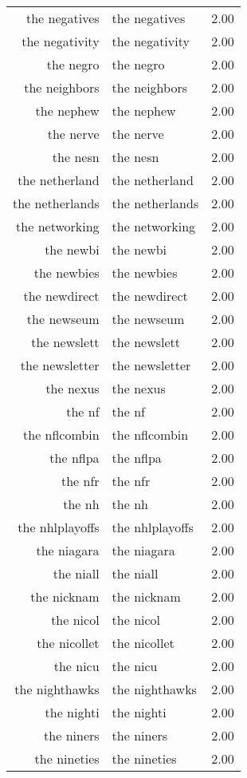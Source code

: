 \begin{table}[ht]
\begin{tabular}{rlr}
  the negatives & the negatives & 2.00 \\ 
  the negativity & the negativity & 2.00 \\ 
  the negro & the negro & 2.00 \\ 
  the neighbors & the neighbors & 2.00 \\ 
  the nephew & the nephew & 2.00 \\ 
  the nerve & the nerve & 2.00 \\ 
  the nesn & the nesn & 2.00 \\ 
  the netherland & the netherland & 2.00 \\ 
  the netherlands & the netherlands & 2.00 \\ 
  the networking & the networking & 2.00 \\ 
  the newbi & the newbi & 2.00 \\ 
  the newbies & the newbies & 2.00 \\ 
  the newdirect & the newdirect & 2.00 \\ 
  the newseum & the newseum & 2.00 \\ 
  the newslett & the newslett & 2.00 \\ 
  the newsletter & the newsletter & 2.00 \\ 
  the nexus & the nexus & 2.00 \\ 
  the nf & the nf & 2.00 \\ 
  the nflcombin & the nflcombin & 2.00 \\ 
  the nflpa & the nflpa & 2.00 \\ 
  the nfr & the nfr & 2.00 \\ 
  the nh & the nh & 2.00 \\ 
  the nhlplayoffs & the nhlplayoffs & 2.00 \\ 
  the niagara & the niagara & 2.00 \\ 
  the niall & the niall & 2.00 \\ 
  the nicknam & the nicknam & 2.00 \\ 
  the nicol & the nicol & 2.00 \\ 
  the nicollet & the nicollet & 2.00 \\ 
  the nicu & the nicu & 2.00 \\ 
  the nighthawks & the nighthawks & 2.00 \\ 
  the nighti & the nighti & 2.00 \\ 
  the niners & the niners & 2.00 \\ 
  the nineties & the nineties & 2.00 \\ 

\end{tabular}
\end{table}
